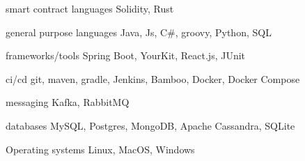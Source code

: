 

\begin{cvskills}

  \cvskill
    {smart contract languages} %
    {Solidity, Rust} %

  \cvskill
    {general purpose languages} %
    {Java, Js, C\#, groovy, Python, SQL} %

  \cvskill
    {frameworks/tools} %
    {Spring Boot, YourKit, React.js, JUnit} %

  \cvskill
    {ci/cd} %
    {git, maven, gradle, Jenkins, Bamboo, Docker, Docker Compose} %

  \cvskill
    {messaging} %
    {Kafka, RabbitMQ} %

  \cvskill
    {databases} %
    {MySQL, Postgres, MongoDB, Apache Cassandra, SQLite} %

  \cvskill
    {Operating systems} %
    {Linux, MacOS, Windows} %

\end{cvskills}
